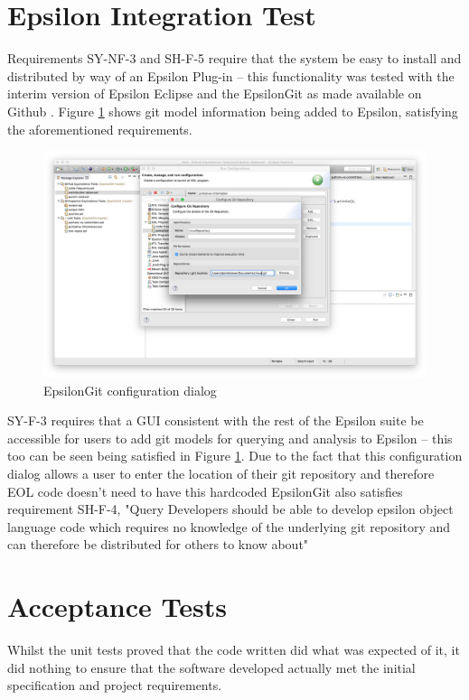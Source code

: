 \documentclass[11pt]{book}
\begin{document}
\section{Epsilon Integration Test}
\label{evalepsilonintegration}
Requirements SY-NF-3 and SH-F-5 require that the system be easy to install and distributed by way of an Epsilon Plug-in -- this functionality was tested with the interim version of Epsilon Eclipse and the EpsilonGit as made available on Github \cite{epsilongitgithub}. Figure \ref{fig:epsilonintegration} shows git model information being added to Epsilon, satisfying the aforementioned requirements.

\begin{figure}[h]
	\centering
	\includegraphics[width=\textwidth]{images/epsilonintegration}
	\caption{EpsilonGit configuration dialog}
	\label{fig:epsilonintegration}
\end{figure}

SY-F-3 requires that a GUI consistent with the rest of the Epsilon suite be accessible for users to add git models for querying and analysis to Epsilon -- this too can be seen being satisfied in Figure \ref{fig:epsilonintegration}. Due to the fact that this configuration dialog allows a user to enter the location of their git repository and therefore EOL code doesn't need to have this hardcoded EpsilonGit also satisfies requirement SH-F-4, "Query Developers should be able to develop epsilon object language code which requires no knowledge of the underlying git repository and can therefore be distributed for others to know about"

\section{Acceptance Tests}
\label{evalacceptance}
Whilst the unit tests proved that the code written did what was expected of it, it did nothing to ensure that the software developed actually met the initial specification and project requirements.
\end{document}
